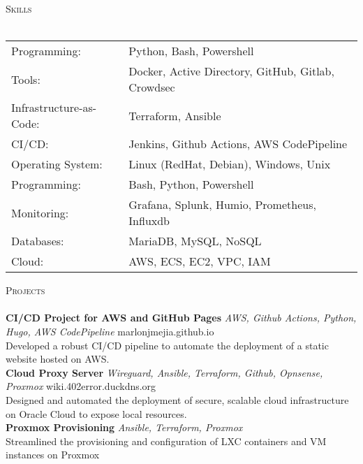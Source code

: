 \documentclass[a4paper]{article}
\newcommand{\lineunder} {
    \vspace*{-8pt} \\
    \hspace*{-18pt} \hrulefill \\
}
\newcommand{\header} [1] {
    {\hspace*{-18pt}\vspace*{6pt} \textsc{#1}}
    \vspace*{-6pt} \lineunder
}
\begin{document}
\header{Skills}
\begin{tabular}{ l l }
	Programming:            & Python, Bash, Powershell                           \\
	Tools:                  & Docker, Active Directory, GitHub, Gitlab, Crowdsec \\
	Infrastructure-as-Code: & Terraform, Ansible                                 \\
	CI/CD:                  & Jenkins, Github Actions, AWS CodePipeline          \\
	Operating System:       & Linux (RedHat, Debian), Windows, Unix              \\
	Programming:            & Bash, Python, Powershell                           \\
	Monitoring:             & Grafana, Splunk, Humio, Prometheus, Influxdb       \\
	Databases:              & MariaDB, MySQL, NoSQL                              \\
	Cloud:                  & AWS, ECS, EC2, VPC, IAM                            \\
\end{tabular}
\vspace{2mm}

\header{Projects}
{\textbf{CI/CD Project for AWS and GitHub Pages}} {\sl AWS, Github Actions, Python, Hugo, AWS CodePipeline} \hfill marlonjmejia.github.io\\
Developed a robust CI/CD pipeline to automate the deployment of a static website hosted on AWS.\\
\vspace*{2mm}
{\textbf{Cloud Proxy Server}} {\sl Wireguard, Ansible, Terraform, Github, Opnsense, Proxmox} \hfill wiki.402error.duckdns.org\\
Designed and automated the deployment of secure, scalable cloud infrastructure on Oracle Cloud to expose local resources.\\
\vspace*{2mm}
{\textbf{Proxmox Provisioning}} {\sl Ansible, Terraform, Proxmox} \\
Streamlined the provisioning and configuration of LXC containers and VM instances on Proxmox\\
\vspace*{2mm}



\ 
\end{document}
